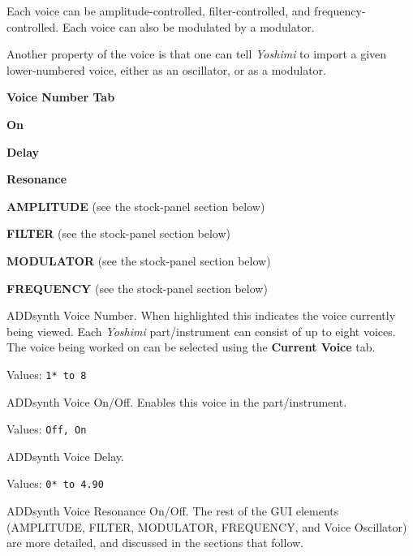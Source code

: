    Each voice can be amplitude-controlled, filter-controlled, and
   frequency-controlled.  Each voice can also be modulated by a
   modulator.

%
  Another property of the voice is that one can tell \textsl{Yoshimi} to import
  a given lower-numbered voice, either as an oscillator, or as a modulator.


   \begin{enumber}
      \item \textbf{Voice Number Tab}
      \item \textbf{On}
      \item \textbf{Delay}
      \item \textbf{Resonance}
      \item \textbf{AMPLITUDE} (see the stock-panel section below)
      \item \textbf{FILTER} (see the stock-panel section below)
      \item \textbf{MODULATOR} (see the stock-panel section below)
      \item \textbf{FREQUENCY} (see the stock-panel section below)
   \end{enumber}

   \setcounter{ItemCounter}{0}      %

   ADDsynth Voice Number.
   When highlighted this indicates the voice currently being viewed.  Each
   \textsl{Yoshimi} part/instrument can consist of up to eight voices. The
   voice being worked on can be selected using the \textbf{Current Voice} tab.

   Values: \texttt{1* to 8}

   ADDsynth Voice On/Off.
   Enables this voice in the part/instrument.

   Values: \texttt{Off, On}

   ADDsynth Voice Delay.

   Values: \texttt{0* to 4.90}

   ADDsynth Voice Resonance On/Off.
   The rest of the GUI elements
   (AMPLITUDE, FILTER, MODULATOR, FREQUENCY, and Voice Oscillator)
   are more detailed, and discussed in the sections that follow.


